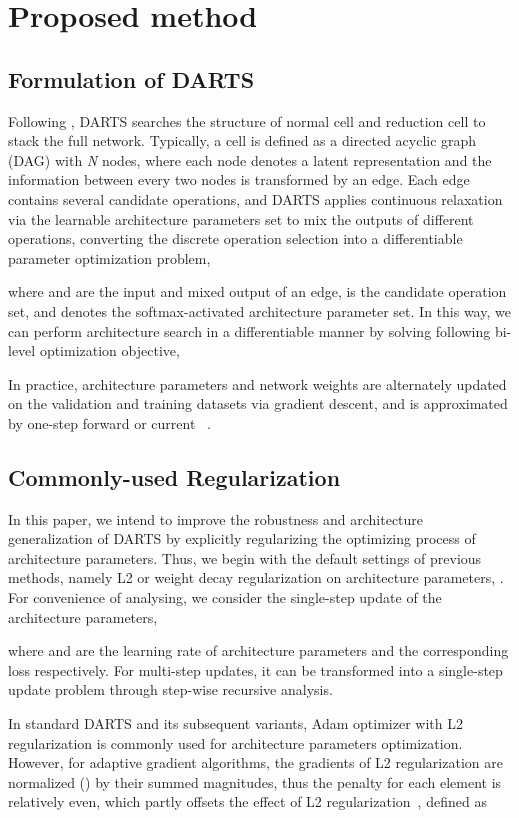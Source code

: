 \documentclass[10pt,twocolumn,letterpaper]{article}
\begin{document}
\section{Proposed method} \label{sec:method}
\subsection{Formulation of DARTS}
Following \cite{zoph2018learning}, DARTS searches the structure of normal cell and reduction cell to stack the full network. Typically, a cell is defined as a directed acyclic graph (DAG) with \textit{N} nodes, where each node denotes a latent representation and the information between every two nodes is transformed by an edge. Each edge  contains several candidate operations, and DARTS applies continuous relaxation via the learnable architecture parameters set  to mix the outputs of different operations, converting the discrete operation selection into a differentiable parameter optimization problem,
 
where  and  are the input and mixed output of an edge,  is the candidate operation set, and  denotes the softmax-activated architecture parameter set. In this way, we can perform architecture search in a differentiable manner by solving following bi-level optimization objective,

In practice, architecture parameters  and network weights  are alternately updated on the validation and training datasets via gradient descent, and  is approximated by one-step forward or current ~\cite{darts}.

\subsection{Commonly-used Regularization}
In this paper, we intend to improve the robustness and architecture generalization of DARTS by explicitly regularizing the optimizing process of architecture parameters. Thus, we begin with the default settings of previous methods, namely L2 or weight decay regularization on architecture parameters, . For convenience of analysing, we consider the single-step update of the architecture parameters,

where  and  are the learning rate of architecture parameters and the corresponding loss respectively. For multi-step updates, it can be transformed into a single-step update problem through step-wise recursive analysis.

In standard DARTS and its subsequent variants, Adam optimizer with L2 regularization is commonly used for architecture parameters optimization. However, for adaptive gradient algorithms, the gradients of L2 regularization are normalized () by their summed magnitudes, thus the penalty for each element is relatively even, which partly offsets the effect of L2 regularization~\cite{dwd}, defined as
\end{document}
